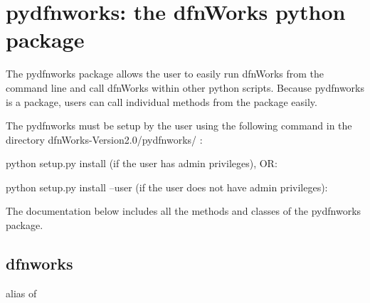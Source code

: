 \documentclass[letterpaper,10pt,english]{sphinxmanual}
\begin{document}
\begin{sphinxVerbatim}[commandchars=\\\{\}]
 

 

 

 

\end{sphinxVerbatim}


\chapter{pydfnworks: the dfnWorks python package}
\label{\detokenize{pydfnworks:dfnworks-python-chapter}}\label{\detokenize{pydfnworks::doc}}\label{\detokenize{pydfnworks:pydfnworks-the-dfnworks-python-package}}
The pydfnworks package allows the user to easily run dfnWorks from the command line and  call dfnWorks within other python scripts. Because pydfnworks is a package, users can call individual methods from the package easily.

The pydfnworks must be setup by the user using the following command in the directory dfnWorks-Version2.0/pydfnworks/ :

python setup.py install (if the user has admin privileges), OR:

python setup.py install --user (if the user does not have admin privileges):

The documentation below includes all the methods and classes of the pydfnworks package.


\section{dfnworks}
\label{\detokenize{pydfnworks:dfnworks}}

\begin{fulllineitems}
\label{\detokenize{pydfnworks:pydfnworks.dfnworks}}
alias of {\hyperref[\detokenize{pydfnworks:pydfnworks.dfnworks}]{}}

\end{fulllineitems}
\end{document}
